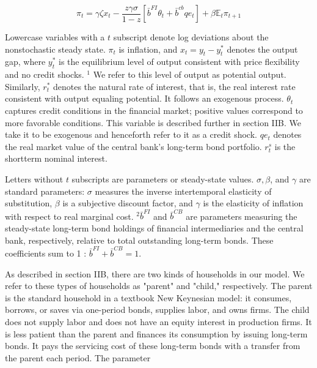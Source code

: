 \documentclass[10pt]{article}
\begin{document}
\begin{equation*}
\pi_{t}=\gamma \zeta x_{t}-\frac{z \gamma \sigma}{1-z}\left[\bar{b}^{F I} \theta_{t}+\bar{b}^{c b} q e_{t}\right]+\beta \mathbb{E}_{t} \pi_{t+1} \tag{2}
\end{equation*}

Lowercase variables with a $t$ subscript denote log deviations about the nonstochastic steady state. $\pi_{t}$ is inflation, and $x_{t}=y_{t}-y_{t}^{*}$ denotes the output gap, where $y_{t}^{*}$ is the equilibrium level of output consistent with price flexibility and no credit shocks. ${ }^{1}$ We refer to this level of output as potential output. Similarly, $r_{t}^{*}$ denotes the natural rate of interest, that is, the real interest rate consistent with output equaling potential. It follows an exogenous process. $\theta_{t}$ captures credit conditions in the financial market; positive values correspond to more favorable conditions. This variable is described further in section IIB. We take it to be exogenous and henceforth refer to it as a credit shock. $q e_{t}$ denotes the real market value of the central bank's long-term bond portfolio. $r_{t}^{s}$ is the shortterm nominal interest.

Letters without $t$ subscripts are parameters or steady-state values. $\sigma, \beta$, and $\gamma$ are standard parameters: $\sigma$ measures the inverse intertemporal elasticity of substitution, $\beta$ is a subjective discount factor, and $\gamma$ is the elasticity of inflation with respect to real marginal cost. ${ }^{2} \bar{b}^{F I}$ and $\bar{b}^{C B}$ are parameters measuring the steady-state long-term bond holdings of financial intermediaries and the central bank, respectively, relative to total outstanding long-term bonds. These coefficients sum to 1 : $\bar{b}^{F I}+\bar{b}^{C B}=1$.

As described in section IIB, there are two kinds of households in our model. We refer to these types of households as "parent" and "child," respectively. The parent is the standard household in a textbook New Keynesian model: it consumes, borrows, or saves via one-period bonds, supplies labor, and owns firms. The child does not supply labor and does not have an equity interest in production firms. It is less patient than the parent and finances its consumption by issuing long-term bonds. It pays the servicing cost of these long-term bonds with a transfer from the parent each period. The parameter
\end{document}

